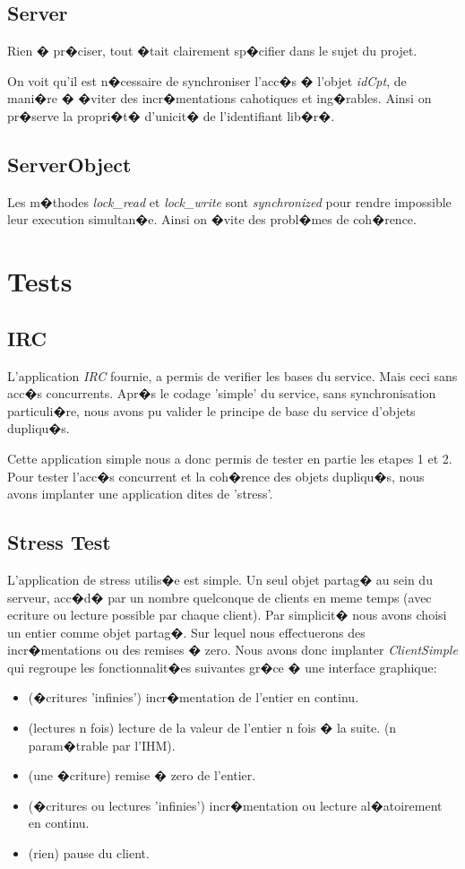 \documentclass[]{report}   %
\begin{document}
\subsection{Server}
Rien � pr�ciser, tout �tait clairement sp�cifier dans le sujet du
projet.

On voit qu'il est n�cessaire de synchroniser l'acc�s � l'objet
\textit{idCpt}, de mani�re � �viter des incr�mentations cahotiques et
ing�rables. Ainsi on pr�serve la propri�t� d'unicit� de
l'identifiant lib�r�.

\subsection{ServerObject}

Les m�thodes \textit{lock\_read} et \textit{lock\_write} sont
\textit{synchronized} pour rendre impossible leur execution simultan�e.
Ainsi on �vite des probl�mes de coh�rence.

\section{Tests}

\subsection{IRC}
L'application \textit{IRC} fournie, a permis de verifier les bases du service.
Mais ceci sans acc�s concurrents. Apr�s le codage 'simple' du service, sans
synchronisation particuli�re, nous avons pu valider le principe de base du
service d'objets dupliqu�s.

Cette application simple nous a donc permis de tester en partie les etapes 1 et
2.
Pour tester l'acc�s concurrent et la coh�rence des objets dupliqu�s, nous avons
implanter une application dites de 'stress'.

\subsection{Stress Test}
L'application de stress utilis�e est simple. Un seul objet partag� au sein du
serveur, acc�d� par un nombre quelconque de clients en meme temps (avec
ecriture ou lecture possible par chaque client). Par simplicit� nous avons
choisi un entier comme objet partag�. Sur lequel nous effectuerons des incr�mentations ou
des remises � zero.
Nous avons donc implanter \textit{ClientSimple} qui regroupe les
fonctionnalit�es suivantes gr�ce � une interface graphique:
\begin{itemize}
\item (�critures 'infinies') incr�mentation de l'entier en continu.
\item (lectures n fois) lecture de la valeur de l'entier n fois � la suite. (n
param�trable par l'IHM).
\item (une �criture) remise � zero de l'entier.
\item (�critures ou lectures 'infinies') incr�mentation ou lecture al�atoirement
en continu.
\item (rien) pause du client.\\
\end{itemize}
\end{document}
